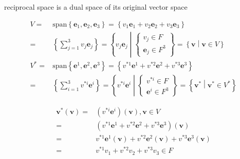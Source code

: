 \documentclass[
]{book}
\theoremstyle{definition}
\theoremstyle{definition}
\theoremstyle{definition}
\theoremstyle{definition}
\theoremstyle{remark}
\begin{document}
reciprocal space is a dual space of its original vector space

\[
\begin{aligned}
V= & \mathrm{span}\left\{ \boldsymbol{e}_{{\scriptscriptstyle 1}},\boldsymbol{e}_{{\scriptscriptstyle 2}},\boldsymbol{e}_{{\scriptscriptstyle 3}}\right\} =\left\{ v_{{\scriptscriptstyle 1}}\boldsymbol{e}_{{\scriptscriptstyle 1}}+v_{{\scriptscriptstyle 2}}\boldsymbol{e}_{{\scriptscriptstyle 2}}+v_{{\scriptscriptstyle 3}}\boldsymbol{e}_{{\scriptscriptstyle 3}}\right\} \\
= & \left\{ \sum_{j=1}^{3}v_{{\scriptscriptstyle j}}\boldsymbol{e}_{{\scriptscriptstyle j}}\right\} =\left\{ v_{{\scriptscriptstyle j}}\boldsymbol{e}_{{\scriptscriptstyle j}}\middle|\begin{cases}
v_{{\scriptscriptstyle j}}\in F\\
\boldsymbol{e}_{{\scriptscriptstyle j}}\in F^{3}
\end{cases}\right\} =\left\{ \boldsymbol{v}\middle|\boldsymbol{v}\in V\right\} \\
V^{*}= & \mathrm{span}\left\{ \boldsymbol{e}^{{\scriptscriptstyle 1}},\boldsymbol{e}^{{\scriptscriptstyle 2}},\boldsymbol{e}^{{\scriptscriptstyle 3}}\right\} =\left\{ v^{*{\scriptscriptstyle 1}}\boldsymbol{e}^{{\scriptscriptstyle 1}}+v^{*{\scriptscriptstyle 2}}\boldsymbol{e}^{{\scriptscriptstyle 2}}+v^{*{\scriptscriptstyle 3}}\boldsymbol{e}^{{\scriptscriptstyle 3}}\right\} \\
= & \left\{ \sum_{i=1}^{3}v^{*{\scriptscriptstyle i}}\boldsymbol{e}^{{\scriptscriptstyle i}}\right\} =\left\{ v^{*{\scriptscriptstyle i}}\boldsymbol{e}^{{\scriptscriptstyle i}}\middle|\begin{cases}
v^{*{\scriptscriptstyle i}}\in F\\
\boldsymbol{e}^{{\scriptscriptstyle i}}\in F^{3}
\end{cases}\right\} =\left\{ \boldsymbol{v}^{*}\middle|\boldsymbol{v}^{*}\in V^{*}\right\} 
\end{aligned}
\]

\[
\begin{aligned}
\boldsymbol{v}^{*}\left(\boldsymbol{v}\right)= & \left(v^{*{\scriptscriptstyle i}}\boldsymbol{e}^{{\scriptscriptstyle i}}\right)\left(\boldsymbol{v}\right),\boldsymbol{v}\in V\\
= & \left(v^{*{\scriptscriptstyle 1}}\boldsymbol{e}^{{\scriptscriptstyle 1}}+v^{*{\scriptscriptstyle 2}}\boldsymbol{e}^{{\scriptscriptstyle 2}}+v^{*{\scriptscriptstyle 3}}\boldsymbol{e}^{{\scriptscriptstyle 3}}\right)\left(\boldsymbol{v}\right)\\
= & v^{*{\scriptscriptstyle 1}}\boldsymbol{e}^{{\scriptscriptstyle 1}}\left(\boldsymbol{v}\right)+v^{*{\scriptscriptstyle 2}}\boldsymbol{e}^{{\scriptscriptstyle 2}}\left(\boldsymbol{v}\right)+v^{*{\scriptscriptstyle 3}}\boldsymbol{e}^{{\scriptscriptstyle 3}}\left(\boldsymbol{v}\right)\\
= & v^{*{\scriptscriptstyle 1}}v_{{\scriptscriptstyle 1}}+v^{*{\scriptscriptstyle 2}}v_{{\scriptscriptstyle 2}}+v^{*{\scriptscriptstyle 3}}v_{{\scriptscriptstyle 3}}\in F
\end{aligned}
\]
\end{document}
